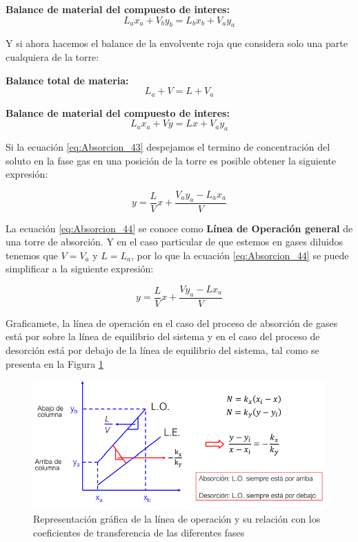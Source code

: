 \documentclass[11pt]{book}
\begin{document}
\textbf{Balance de material del compuesto de interes:}
\begin{equation}
    \label{eq:Absorcion_41}
    L_a x_a + V_b y_b = L_b x_b + V_a y_a
\end{equation}

Y si ahora hacemos el balance de la envolvente roja que considera solo una parte cualquiera de la torre:

\textbf{Balance total de materia:}
\begin{equation}
    \label{eq:Absorcion_42}
    L_a + V = L + V_a
\end{equation}

\textbf{Balance de material del compuesto de interes:}
\begin{equation}
    \label{eq:Absorcion_43}
    L_a x_a + V y = L x + V_a y_a
\end{equation}

Si la ecuación \ref{eq:Absorcion_43} despejamos el termino de concentración del soluto en la fase gas en una posición de la torre es posible obtener la siguiente expresión:

\begin{equation}
    \label{eq:Absorcion_44}
    y = \frac{L}{V} x + \frac{V_a y_a - L_a x_a }{V}
\end{equation}

La ecuación \ref{eq:Absorcion_44} se conoce como \textbf{Línea de Operación general} de una torre de absorción. Y en el caso particular de que estemos en gases diluidos tenemos que $V = V_a$ y $L = L_a$, por lo que la ecuación \ref{eq:Absorcion_44} se puede simplificar a la siguiente expresión:

\begin{equation}
    \label{eq:Absorcion_45}
    y = \frac{L}{V} x + \frac{V y_a - L x_a }{V}
\end{equation}

Graficamete, la línea de operación en el caso del proceso de absorción de gases está por sobre la línea de equilibrio del sistema y en el caso del proceso de desorción está por debajo de la línea de equilibrio del sistema, tal como se presenta en la Figura \ref{fig:Absorcion_9}

\begin{figure}
    \centering
    \includegraphics{img/absorcion/Absorcion_9.PNG}
    \caption{Representación gráfica de la línea de operación y su relación con los coeficientes de transferencia de las diferentes fases}
    \label{fig:Absorcion_9}
\end{figure}
\end{document}
